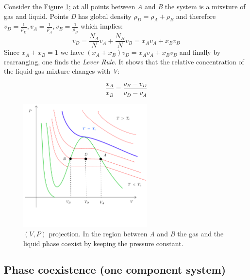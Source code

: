 \documentclass[../main/main.tex]{subfiles}
\begin{document}
\begin{example}

  Consider the Figure \ref{fig:3_0}; at all points between \emph{A} and \emph{B} the system is a mixsture of gas and liquid. Points \emph{D} has global density \( \rho_D = \rho_A + \rho_B \)  and therefore \( v_D = \frac{1}{\rho_D}, v_A = \frac{1}{\rho _A}, v_B = \frac{1}{\rho_B} \) which implies:
  \begin{equation*}
    v_D = \frac{N_A}{N} v_A + \frac{N_B}{N} v_B = x_A v_A + x_B v_B
    \label{eq:}
  \end{equation*}
  Since \( x_A + x_B = 1 \) we have \( (x_A + x_B)v_D = x_A v_A + x_B v_B \) and finally by rearranging, one finds the \textit{Lever Rule}. It shows that the relative concentration of the liquid-gas mixture changes with \emph{V}:

  \begin{equation}
    \frac{x_A}{x_B} = \frac{v_B - v_D}{v_D - v_A}
    \label{eq:}
  \end{equation}

  \begin{figure}[h!]
  \centering
  \includegraphics[width=0.6\textwidth]{../lessons/3_image/1.pdf}
  \caption{\label{fig:3_0} \( (V,P) \) projection. In the region between \emph{A} and \emph{B} the gas and the liquid phase coexist by keeping the pressure constant.}
  \end{figure}

\end{example}


\subsection{Phase coexistence (one component system)}
\end{document}
